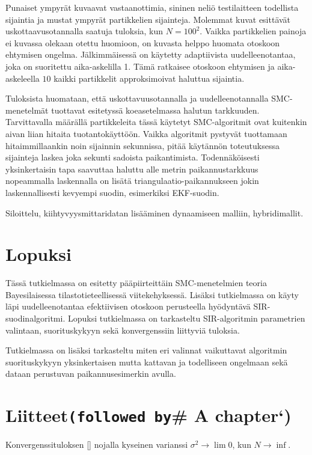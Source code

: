 \documentclass[
  12pt,
  a4paper, twoside]{book}
\begin{document}
Punaiset ympyrät kuvaavat vastaanottimia, sininen neliö testilaitteen todellista sijaintia ja mustat ympyrät partikkelien sijainteja. Molemmat kuvat esittävät uskottaavusotannalla saatuja tuloksia, kun \(N=100^2\). Vaikka partikkelien painoja ei kuvassa olekaan otettu huomioon, on kuvasta helppo huomata otoskoon ehtymisen ongelma. Jälkimmäisessä on käytetty adaptiivista uudelleenotantaa, joka on suoritettu aika-askelilla 1. Tämä ratkaisee otoskoon ehtymisen ja aika-askeleella \(10\) kaikki partikkelit approksimoivat haluttua sijaintia.

Tuloksista huomataan, että uskottavuusotannalla ja uudelleenotannalla SMC-menetelmät tuottavat esitetyssä koeasetelmassa halutun tarkkuuden. Tarvittavalla määrällä partikkeleita tässä käytetyt SMC-algoritmit ovat kuitenkin aivan liian hitaita tuotantokäyttöön. Vaikka algoritmit pystyvät tuottamaan hitaimmillaankin noin sijainnin sekunnissa, pitää käytännön toteutuksessa sijainteja laskea joka sekunti sadoista paikantimista. Todennäköisesti yksinkertaisin tapa saavuttaa haluttu alle metrin paikannustarkkuus nopeammalla laskennalla on lisätä triangulaatio-paikannukseen jokin laskennallisesti kevyempi suodin, esimerkiksi EKF-suodin.

Siloittelu, kiihtyvyysmittaridatan lisääminen dynaamiseen malliin, hybridimallit.

\hypertarget{lopuksi}{%
\chapter{Lopuksi}\label{lopuksi}}

Tässä tutkielmassa on esitetty pääpiirteittäin SMC-menetelmien teoria Bayesilaisessa tilastotieteellisessä viitekehyksessä. Lisäksi tutkielmassa on käyty läpi uudelleenotantaa efektiivisen otoskoon perusteella hyödyntävä SIR-suodinalgoritmi. Lopuksi tutkielmassa on tarkasteltu SIR-algoritmin parametrien valintaan, suorituskykyyn sekä konvergenssiin liittyviä tuloksia.

Tutkielmassa on lisäksi tarkasteltu miten eri valinnat vaikuttavat algoritmin suorituskykyyn yksinkertaisen mutta kattavan ja todelliseen ongelmaan sekä dataan perustuvan paikannusesimerkin avulla.

\hypertarget{liitteetfollowed-by-a-chapter}{%
\chapter{\texorpdfstring{Liitteet\texttt{(followed\ by}\# A chapter`)}{Liitteet(followed by\# A chapter`)}}\label{liitteetfollowed-by-a-chapter}}

Konvergenssituloksen \ref{} nojalla kyseinen varianssi \(\sigma^2 \rightarrow \lim 0\), kun \(N \rightarrow \inf\).

  
\end{document}
